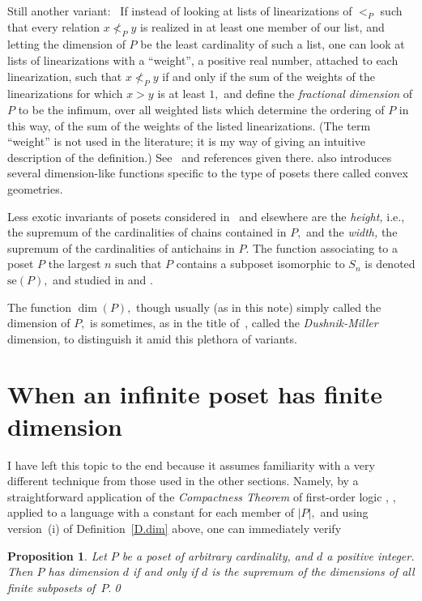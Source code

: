\documentclass{amsart}
\newtheorem{proposition}[theorem]{Proposition}
\numberwithin{equation}{section}
\numberwithin{theorem}{section}
\renewcommand{\r}{\mathrm}
\newcommand{\2}{\mathbf{2}}
\begin{document}
Still another variant: \ If instead of looking at lists
of linearizations
of $<_P$ such that every relation $x\not<_P y$ is realized
in at least one member of our list, and letting the dimension of
$P$ be the least cardinality of such a list, one can look at
lists of linearizations with a ``weight'',
a positive real number, attached to each linearization, such that
$x\not<_P y$ if and only if the sum of the weights of the
linearizations for which $x>y$ is at least $1,$
and define the {\em fractional dimension} of $P$ to be the infimum,
over all weighted lists which determine the ordering of $P$
in this way, of the sum of the weights of the listed linearizations.
(The term ``weight'' is not used in the literature; it is my way
of giving an intuitive description of the definition.)
See~\cite[p.5]{KK+WT} and references given there.
\cite{KK+WT} also introduces several dimension-like
functions specific to the type of posets there called
convex geometries.

Less exotic invariants of posets considered in~\cite{comparing} and
elsewhere are
the {\em height,} i.e., the supremum of the cardinalities of chains
contained in $P,$ and the {\em width,} the supremum of the
cardinalities of antichains in $P.$
The function associating to a poset $P$
the largest $n$ such that $P$ contains a subposet isomorphic
to $S_n$ is denoted $\r{se}(P),$ and studied
in \cite{random} and \cite[\S5.2.1]{Trotter}.

The function $\dim(P),$ though usually (as in this note) simply called
the dimension of $P,$ is sometimes, as in the title of~\cite{comparing},
called the {\em Dushnik-Miller} dimension, to distinguish
it amid this plethora of variants.

\section{When an infinite poset has finite dimension}\label{S.inf_fr_fin}

I have left this topic to the end because it assumes
familiarity with a very different
technique from those used in the other sections.
Namely, by a straightforward application of the
{\em Compactness Theorem} of
first-order logic \cite[Theorem VI.2.1(b)]{E+F+T},
\cite[Theorem 6.1.1]{Hodges}, applied to a language with
a constant for each member of $|P|,$
and using version~(i) of Definition~\ref{D.dim} above,
one can immediately verify

\begin{proposition}\label{P.inf_fr_fin}
Let $P$ be a poset of arbitrary cardinality, and $d$ a positive integer.
Then $P$ has dimension $d$ if and only if $d$ is the
supremum of the dimensions of all finite subposets of~$P.$\qed
\end{proposition}
\end{document}
